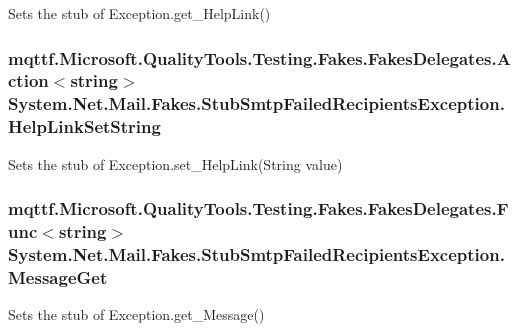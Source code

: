 Sets the stub of Exception.\-get\-\_\-\-Help\-Link()

\hypertarget{class_system_1_1_net_1_1_mail_1_1_fakes_1_1_stub_smtp_failed_recipients_exception_a4ced99e5f83be1afac4327e694a1c2b1}{
\subsubsection[{Help\-Link\-Set\-String}]{\setlength{\rightskip}{0pt plus 5cm}mqttf.\-Microsoft.\-Quality\-Tools.\-Testing.\-Fakes.\-Fakes\-Delegates.\-Action$<$string$>$ System.\-Net.\-Mail.\-Fakes.\-Stub\-Smtp\-Failed\-Recipients\-Exception.\-Help\-Link\-Set\-String}}\label{class_system_1_1_net_1_1_mail_1_1_fakes_1_1_stub_smtp_failed_recipients_exception_a4ced99e5f83be1afac4327e694a1c2b1}


Sets the stub of Exception.\-set\-\_\-\-Help\-Link(\-String value)

\hypertarget{class_system_1_1_net_1_1_mail_1_1_fakes_1_1_stub_smtp_failed_recipients_exception_a6872bafb6b3d099d8f2e975d821efc15}{
\subsubsection[{Message\-Get}]{\setlength{\rightskip}{0pt plus 5cm}mqttf.\-Microsoft.\-Quality\-Tools.\-Testing.\-Fakes.\-Fakes\-Delegates.\-Func$<$string$>$ System.\-Net.\-Mail.\-Fakes.\-Stub\-Smtp\-Failed\-Recipients\-Exception.\-Message\-Get}}\label{class_system_1_1_net_1_1_mail_1_1_fakes_1_1_stub_smtp_failed_recipients_exception_a6872bafb6b3d099d8f2e975d821efc15}


Sets the stub of Exception.\-get\-\_\-\-Message()

